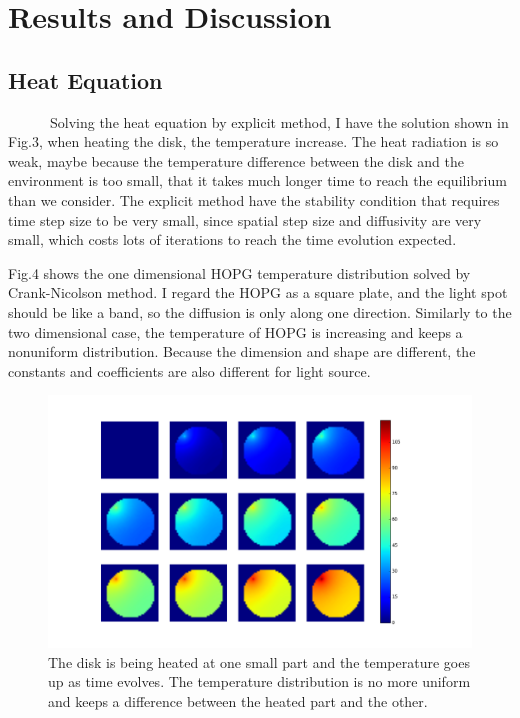 \documentclass[a4paper,11pt]{article}
\theoremstyle{mytheor}
\begin{document}
\clearpage

\section{Results and Discussion}
\subsection*{Heat Equation}

\ \ \ \ \ \ Solving the heat equation by explicit method, I have the solution shown in Fig.3, when heating the disk, the temperature increase. The heat radiation is so weak, maybe because the temperature difference between the disk and the environment is too small, that it takes much longer time to reach the equilibrium than we consider. The explicit method have the stability condition that requires time step size to be very small, since spatial step size and diffusivity are very small, which costs lots of iterations to reach the time evolution expected.

Fig.4 shows the one dimensional HOPG temperature distribution solved by Crank-Nicolson method. I regard the HOPG as a square plate, and the light spot should be like a band, so the diffusion is only along one direction. Similarly to the two dimensional case, the temperature of HOPG is increasing and keeps a nonuniform distribution. Because the dimension and shape are different, the constants and coefficients are also different for light source.

\begin{figure}[!htb]
\centering
\includegraphics[width=\textwidth]{figure_3.png}
\caption{The disk is being heated at one small part and the temperature goes up as time evolves. The temperature distribution is no more uniform and keeps a difference between the heated part and the other.}
\end{figure}
\end{document}
